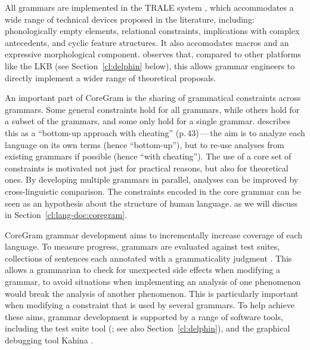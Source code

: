 \documentclass[output=paper,nonflat]{langsci/langscibook}
\begin{document}
All grammars are implemented
in the TRALE system \citep{MPR2002a-u,Penn2004a-u},
which accommodates a wide range of technical devices proposed in the literature, including:
phonologically empty elements,
relational constraints,
implications with complex antecedents,
and cyclic feature structures.
It also accomodates macros and an expressive morphological component.
\citet{MelnikHandWritten} observes that,
compared to other platforms like the LKB (see Section~\ref{cl:delphin} below),
this allows grammar engineers to directly implement a wider range of theoretical proposals.

An important part of CoreGram is the sharing of grammatical constraints across grammars.
Some general constraints hold for all grammars,
while others hold for a subset of the grammars,
and some only hold for a single grammar.
\citet{MuellerCoreGram} describes this as a
``bottom-up approach with cheating'' (p.\,43)\,---\,the aim is
to analyze each language on its own terms (hence ``bottom-up''),
but to re-use analyses from existing grammars if possible (hence ``with cheating'').
The use of a core set of constraints is motivated not just for practical reasons,
but also for theoretical ones.
By developing multiple grammars in parallel,
analyses can be improved by cross-linguistic comparison.
The constraints encoded in the core grammar
can be seen as an hypothesis about the structure of human language.
as we will discuss in Section~\ref{cl:lang-doc:coregram}.

CoreGram grammar development aims to incrementally increase coverage of each language.
To measure progress, grammars are evaluated against test suites,
collections of sentences each annotated with a grammaticality judgment \citep{ONK97a,Mueller2004f}.
This allows a grammarian to check for unexpected side effects when modifying a grammar,
to avoid situations when implementing an analysis of one phenomenon
would break the analysis of another phenomenon.
This is particularly important when modifying a constraint that is used by several grammars.
To help achieve these aims, grammar development is supported by a range of software tools,
including the test suite tool \itsdb (\citealp{Oepen:01}; see also Section~\ref{cl:delphin}),
and the graphical debugging tool Kahina \citep{DER2010a-u,DER2013a}.
\end{document}

